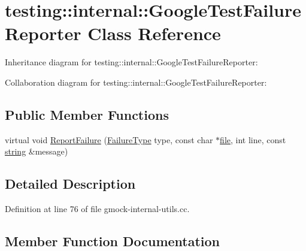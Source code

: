 \hypertarget{classtesting_1_1internal_1_1_google_test_failure_reporter}{}\section{testing\+:\+:internal\+:\+:Google\+Test\+Failure\+Reporter Class Reference}
\label{classtesting_1_1internal_1_1_google_test_failure_reporter}


Inheritance diagram for testing\+:\+:internal\+:\+:Google\+Test\+Failure\+Reporter\+:


Collaboration diagram for testing\+:\+:internal\+:\+:Google\+Test\+Failure\+Reporter\+:
\subsection*{Public Member Functions}
\begin{DoxyCompactItemize}
\item 
virtual void \hyperlink{classtesting_1_1internal_1_1_google_test_failure_reporter_a9b2f81e6c5b6e9f618fd75cc3e27e94c}{Report\+Failure} (\hyperlink{gtest__environment__test_8cc_aa43ad7e2c1c5c5150ba8d95607a96263}{Failure\+Type} type, const char $\ast$\hyperlink{_07copy_08_2_read_camera_model_8m_a151631b2fd2bb776ef06c9f440a7ed74}{file}, int line, const \hyperlink{namespacetesting_1_1internal_a8e8ff5b11e64078831112677156cb111}{string} \&message)
\end{DoxyCompactItemize}


\subsection{Detailed Description}


Definition at line 76 of file gmock-\/internal-\/utils.\+cc.



\subsection{Member Function Documentation}
